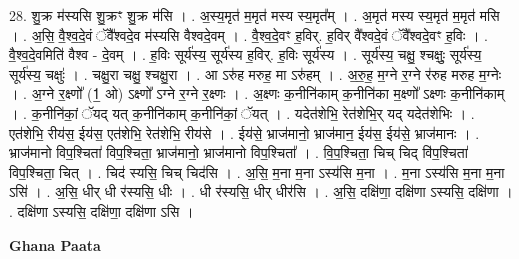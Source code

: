 \documentclass[17pt]{extarticle}
\begin{document}
28. शु॒क्र म॑स्यसि शु॒क्रꣳ शु॒क्र म॑सि । . अ॒स्य॒मृत॑ म॒मृत॑ मस्य स्य॒मृत᳚म् । . अ॒मृत॑ मस्य स्य॒मृत॑ म॒मृत॑ मसि । . अ॒सि॒ वै॒श्व॒दे॒वं ॅवै᳚श्वदे॒व म॑स्यसि वैश्वदे॒वम् । . वै॒श्व॒दे॒वꣳ ह॒विर्. ह॒विर् वै᳚श्वदे॒वं ॅवै᳚श्वदे॒वꣳ ह॒विः । . वै॒श्व॒दे॒वमिति॑ वैश्व - दे॒वम् । . ह॒विः सूर्य॑स्य॒ सूर्य॑स्य ह॒विर्. ह॒विः सूर्य॑स्य । . सूर्य॑स्य॒ चक्षु॒ श्चक्षुः॒ सूर्य॑स्य॒ सूर्य॑स्य॒ चक्षुः॑ । . चक्षु॒रा चक्षु॒ श्चक्षु॒रा । . आ ऽरु॑ह मरुह॒ मा ऽरु॑हम् । . अ॒रु॒ह॒ म॒ग्ने र॒ग्ने र॑रुह मरुह म॒ग्नेः । . अ॒ग्ने र॒क्ष्णो᳚ (1॒ ओ) ऽक्ष्णो᳚ ऽग्ने र॒ग्ने र॒क्ष्णः । . अ॒क्ष्णः क॒नीनि॑काम् क॒नीनि॑का म॒क्ष्णो᳚ ऽक्ष्णः क॒नीनि॑काम् । . क॒नीनि॑कां॒ ॅयद् यत् क॒नीनि॑काम् क॒नीनि॑कां॒ ॅयत् । . यदेत॑शेभि॒ रेत॑शेभि॒र् यद् यदेत॑शेभिः । . एत॑शेभि॒ रीय॑स॒ ईय॑स॒ एत॑शेभि॒ रेत॑शेभि॒ रीय॑से । . ईय॑से॒ भ्राज॑मानो॒ भ्राज॑मान॒ ईय॑स॒ ईय॑से॒ भ्राज॑मानः । . भ्राज॑मानो विप॒श्चिता॑ विप॒श्चिता॒ भ्राज॑मानो॒ भ्राज॑मानो विप॒श्चिता᳚ । . वि॒प॒श्चिता॒ चिच् चिद् वि॑प॒श्चिता॑ विप॒श्चिता॒ चित् । . चिद॑ स्यसि॒ चिच् चिद॑सि । . अ॒सि॒ म॒ना म॒ना ऽस्य॑सि म॒ना । . म॒ना ऽस्य॑सि म॒ना म॒ना ऽसि॑ । . अ॒सि॒ धीर् धी र॑स्यसि॒ धीः । . धी र॑स्यसि॒ धीर् धीर॑सि । . अ॒सि॒ दक्षि॑णा॒ दक्षि॑णा ऽस्यसि॒ दक्षि॑णा । . दक्षि॑णा ऽस्यसि॒ दक्षि॑णा॒ दक्षि॑णा ऽसि । \newline

\textbf{Ghana Paata } \newline
\end{document}
